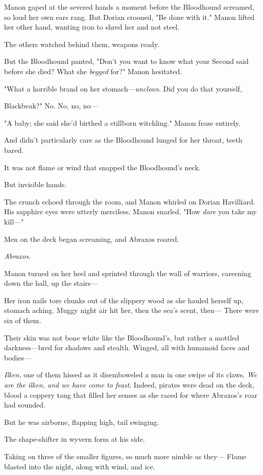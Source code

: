 Manon gaped at the severed hands a moment before the Bloodhound screamed, so loud her own ears rang.
But Dorian crooned, "Be done with it."
Manon lifted her other hand, wanting iron to shred her and not steel.

The others watched behind them, weapons ready.

But the Bloodhound panted, "Don't you want to know what your Second said before she died?
What she \emph{begged} for?"
Manon hesitated.

"What a horrible brand on her stomach---\emph{unclean}.
Did you do that yourself,

Blackbeak?"
No.
No, no, no---

"A baby; she said she'd birthed a stillborn witchling."
Manon froze entirely.

And didn't particularly care as the Bloodhound lunged for her throat, teeth bared.

It was not flame or wind that snapped the Bloodhound's neck.

But invisible hands.

The crunch echoed through the room, and Manon whirled on Dorian Havilliard.
His sapphire eyes were utterly merciless.
Manon snarled.
"How \emph{dare} you take my kill---"

Men on the deck began screaming, and Abraxos roared.

\emph{Abraxos}.

Manon turned on her heel and sprinted through the wall of warriors, careening down the hall, up the stairs---

Her iron nails tore chunks out of the slippery wood as she hauled herself up, stomach aching.
Muggy night air hit her, then the sea's scent, then--- There were six of them.

Their skin was not bone white like the Bloodhound's, but rather a mottled darkness---bred for shadows and stealth.
Winged, all with humanoid faces and bodies---

\emph{Ilken}, one of them hissed as it disemboweled a man in one swipe of its claws.
\emph{We are the ilken, and we have come to feast}.
Indeed, pirates were dead on the deck, blood a coppery tang that filled her senses as she raced for where Abraxos's roar had sounded.

But he was airborne, flapping high, tail swinging.

The shape-shifter in wyvern form at his side.

Taking on three of the smaller figures, so much more nimble as they--- Flame blasted into the night, along with wind, and ice.

